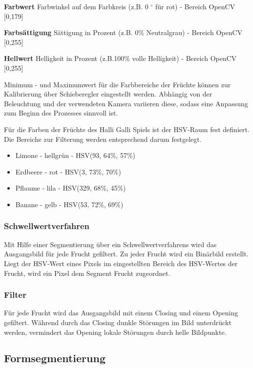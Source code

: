 \textbf{Farbwert} Farbwinkel auf dem Farbkreis (z.B. 0 $^\circ$ für rot) - Bereich OpenCV [0,179]

\textbf{Farbsättigung} Sättigung in Prozent (z.B. 0\% Neutralgrau) - Bereich OpenCV [0,255]

\textbf{Hellwert} Helligkeit in Prozent (z.B.100\% volle Helligkeit) - Bereich OpenCV [0,255]

Minimum - und Maximumwert für die Farbbereiche der Früchte können zur Kalibrierung über Schieberegler eingestellt werden. Abhängig von der Beleuchtung und der verwendeten Kamera variieren diese, sodass eine Anpassung zum Beginn des Prozesses sinnvoll ist. 

Für die Farben der Früchte des Halli Galli Spiels ist der HSV-Raum fest definiert. Die Bereiche zur Filterung werden entsprechend darum festgelegt. 

\begin{itemize}
    \item Limone - hellgrün - HSV(93, 64\%, 57\%)
    \item Erdbeere - rot - HSV(3, 73\%, 70\%)
    \item Pflaume - lila - HSV(329, 68\%, 45\%)
    \item Banane - gelb - HSV(53, 72\%, 69\%)
  
\end{itemize}

\subsubsection{Schwellwertverfahren}

Mit Hilfe einer Segmentierung über ein Schwellwertverfahrens wird das Ausgangsbild für jede Frucht gefiltert. Zu jeder Frucht wird ein Binärbild erstellt. Liegt der HSV-Wert eines Pixels im eingestellten Bereich des HSV-Wertes der Frucht, wird ein Pixel dem Segment Frucht zugeordnet. 

\subsubsection{Filter}

Für jede Frucht wird das Ausgangsbild mit einem Closing und einem Opening gefiltert. Während durch das Closing dunkle Störungen im Bild unterdrückt werden, vermindert das Opening lokale Störungen durch helle Bildpunkte.  

\subsection{Formsegmentierung}

